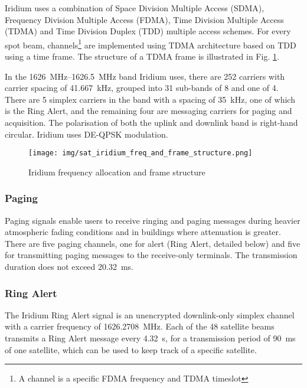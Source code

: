 Iridium uses a combination of Space Division Multiple Access (SDMA),  Frequency Division Multiple Access (FDMA), Time Division Multiple Access (TDMA) and Time Division Duplex (TDD) multiple access schemes\cite{sop11}. For every spot beam, channels\footnote{A channel is a specific FDMA frequency and TDMA timeslot\cite{sat07}} are implemented using TDMA architecture based on TDD using a time frame\cite{sop12}. The structure of a TDMA frame is illustrated in Fig. \ref{f_sat_iridium_freq_and_frame_structure}.

In the \qtyrange{1626}{1626.5}{\MHz} band Iridium uses, there are 252 carriers with carrier spacing of \qty{41.667}{\kHz}, grouped into 31 sub-bands of 8 and one of 4. There are 5 simplex carriers in the band with a spacing of \qty{35}{\kHz}, one of which is the Ring Alert, and the remaining four are messaging carriers for paging and acquisition. The polarisation of both the uplink and downlink band is right-hand circular. Iridium uses DE-QPSK modulation\cite{sat04}.

\begin{figure}
    \centering
    \texttt{[image: img/sat\_iridium\_freq\_and\_frame\_structure.png]}
    \caption{Iridium frequency allocation and frame structure\cite{sop12}}
    \label{f_sat_iridium_freq_and_frame_structure}
\end{figure}

\subsubsection{Paging}
Paging signals enable users to receive ringing and paging messages during heavier atmospheric fading conditions and in buildings where attenuation is greater. There are five paging channels, one for alert (Ring Alert, detailed below) and five for transmitting paging messages to the receive-only terminals.  The transmission duration does not exceed \qty{20.32}{\ms}\cite{sat09}.

\subsubsection{Ring Alert}
The Iridium Ring Alert signal is an unencrypted downlink-only simplex channel with a carrier frequency of \qty{1626.2708}{\MHz}\cite{sat04}. Each of the 48 satellite beams transmits a Ring Alert message every \qty{4.32}{\s}, for a transmission period of \qty{90}{\ms} of one satellite\cite{sat07}, which can be used to keep track of a specific satellite\cite{sop11}.

